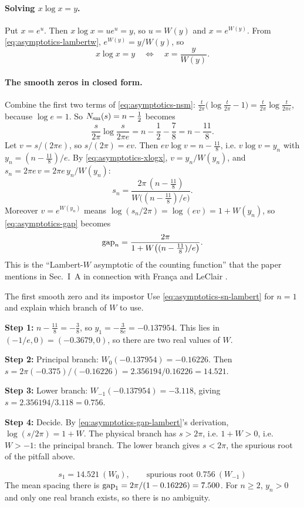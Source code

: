 \paragraph{Solving $x\log x=y$.} Put $x=e^u$. Then $x\log x=ue^u=y$, so $u=W(y)$ and $x=e^{W(y)}$. From \cref{eq:asymptotics-lambertw}, $e^{W(y)}=y/W(y)$, so
\begin{equation}
x\log x=y\quad\Longleftrightarrow\quad x=\frac{y}{W(y)}.
\label{eq:asymptotics-xlogx}
\end{equation}

\paragraph{The smooth zeros in closed form.} Combine the first two terms of \cref{eq:asymptotics-nsm}: $\frac{t}{2\pi}\bigl(\log\frac{t}{2\pi}-1\bigr)=\frac{t}{2\pi}\log\frac{t}{2\pi e}$, because $\log e=1$. So $N_{\mathrm{sm}}(s)=n-\tfrac12$ becomes
\[
\frac{s}{2\pi}\log\frac{s}{2\pi e}=n-\frac12-\frac78=n-\frac{11}{8}.
\]
Let $v=s/(2\pi e)$, so $s/(2\pi)=ev$. Then $ev\log v=n-\tfrac{11}8$, i.e. $v\log v=y_n$ with $y_n=(n-\tfrac{11}{8})/e$. By \cref{eq:asymptotics-xlogx}, $v=y_n/W(y_n)$, and $s_n=2\pi e\,v=2\pi e\,y_n/W(y_n)$:
\begin{equation}
s_n=\frac{2\pi\,(n-\frac{11}{8})}{W\!\bigl((n-\frac{11}{8})/e\bigr)} .
\label{eq:asymptotics-sn-lambert}
\end{equation}
Moreover $v=e^{W(y_n)}$ means $\log(s_n/2\pi)=\log(ev)=1+W(y_n)$, so \cref{eq:asymptotics-gap} becomes
\begin{equation}
\mathrm{gap}_n=\frac{2\pi}{1+W\bigl((n-\frac{11}{8})/e\bigr)} .
\label{eq:asymptotics-gap-lambert}
\end{equation}
This is the ``Lambert-$W$ asymptotic of the counting function'' that the paper mentions in Sec.~I~A in connection with Fran\c ca and LeClair \cite{francaleclair}.

\begin{sample}{The first smooth zero and its impostor}
Use \cref{eq:asymptotics-sn-lambert} for $n=1$ and explain which branch of $W$ to use.

\textbf{Step 1:} $n-\tfrac{11}8=-\tfrac38$, so $y_1=-\tfrac{3}{8e}=-0.137954$. This lies in $(-1/e,0)=(-0.3679,0)$, so there are two real values of $W$.

\textbf{Step 2:} Principal branch: $W_0(-0.137954)=-0.16226$. Then $s=2\pi(-0.375)/(-0.16226)=2.356194/0.16226=14.521$.

\textbf{Step 3:} Lower branch: $W_{-1}(-0.137954)=-3.118$, giving $s=2.356194/3.118=0.756$.

\textbf{Step 4:} Decide. By \cref{eq:asymptotics-gap-lambert}'s derivation, $\log(s/2\pi)=1+W$. The physical branch has $s>2\pi$, i.e. $1+W>0$, i.e. $W>-1$: the principal branch. The lower branch gives $s<2\pi$, the spurious root of the pitfall above.

\[
\boxed{s_1=14.521\ (W_0),\qquad \text{spurious root }0.756\ (W_{-1})}
\]
The mean spacing there is $\mathrm{gap}_1=2\pi/(1-0.16226)=7.500$. For $n\ge2$, $y_n>0$ and only one real branch exists, so there is no ambiguity.
\end{sample}

